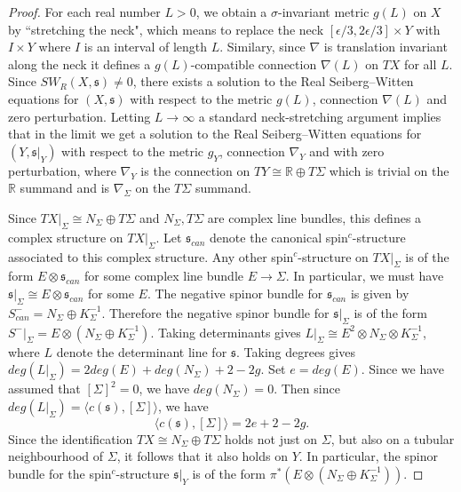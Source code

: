 \documentclass{amsart}
\theoremstyle{definition}
\theoremstyle{remark}
\numberwithin{equation}{section}
\begin{document}
\begin{proof}
For each real number $L > 0$, we obtain a $\sigma$-invariant metric $g(L)$ on $X$ by ``stretching the neck", which means to replace the neck $[\epsilon/3 , 2\epsilon/3] \times Y$ with $I \times Y$ where $I$ is an interval of length $L$. Similary, since $\nabla$ is translation invariant along the neck it defines a $g(L)$-compatible connection $\nabla(L)$ on $TX$ for all $L$. Since $SW_R(X , \mathfrak{s}) \neq 0$, there exists a solution to the Real Seiberg--Witten equations for $(X , \mathfrak{s})$ with respect to the metric $g(L)$, connection $\nabla(L)$ and zero perturbation. Letting $L \to \infty$ a standard neck-stretching argument \cite{km,os} implies that in the limit we get a solution to the Real Seiberg--Witten equations for $(Y , \mathfrak{s}|_Y)$ with respect to the metric $g_Y$, connection $\nabla_Y$ and with zero perturbation, where $\nabla_Y$ is the connection on $TY \cong \mathbb{R} \oplus T\Sigma$ which is trivial on the $\mathbb{R}$ summand and is $\nabla_\Sigma$ on the $T\Sigma$ summand.

Since $TX|_\Sigma \cong N_\Sigma \oplus T\Sigma$ and $N_\Sigma, T\Sigma$ are complex line bundles, this defines a complex structure on $TX|_\Sigma$. Let $\mathfrak{s}_{can}$ denote the canonical spin$^c$-structure associated to this complex structure. Any other spin$^c$-structure on $TX|_\Sigma$ is of the form $E \otimes \mathfrak{s}_{can}$ for some complex line bundle $E \to \Sigma$. In particular, we must have $\mathfrak{s}|_\Sigma \cong E \otimes \mathfrak{s}_{can}$ for some $E$. The negative spinor bundle for $\mathfrak{s}_{can}$ is given by $S_{can}^- = N_\Sigma \oplus K_\Sigma^{-1}$. Therefore the negative spinor bundle for $\mathfrak{s}|_\Sigma$ is of the form $S^-|_\Sigma = E \otimes (N_\Sigma \oplus K_\Sigma^{-1})$. Taking determinants gives $L|_\Sigma \cong E^2 \otimes N_\Sigma \otimes K_\Sigma^{-1}$, where $L$ denote the determinant line for $\mathfrak{s}$. Taking degrees gives $deg(L|_\Sigma) = 2 deg(E) + deg(N_\Sigma) + 2-2g$. Set $e = deg(E)$. Since we have assumed that $[\Sigma]^2 = 0$, we have $deg(N_\Sigma) = 0$. Then since $deg(L|_\Sigma) = \langle c(\mathfrak{s}) , [\Sigma] \rangle$, we have
\[
\langle c(\mathfrak{s}) , [\Sigma] \rangle = 2e + 2-2g.
\]
Since the identification $TX \cong N_\Sigma \oplus T\Sigma$ holds not just on $\Sigma$, but also on a tubular neighbourhood of $\Sigma$, it follows that it also holds on $Y$. In particular, the spinor bundle for the spin$^c$-structure $\mathfrak{s}|_Y$ is of the form $\pi^*( E \otimes (N_\Sigma \oplus K_\Sigma^{-1}) )$.


\end{proof}
\end{document}
